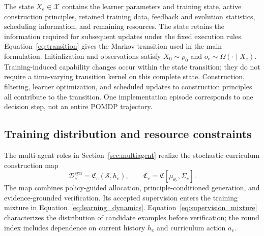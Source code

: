 The state $X_e\in\mathcal X$ contains the learner parameters and training state, active construction principles, retained training data, feedback and evolution statistics, scheduling information, and remaining resources. The state retains the information required for subsequent updates under the fixed execution rules.
Equation~\ref{eq:transition} gives the Markov transition used in the main formulation.
Initialization and observations satisfy $X_0\sim\rho_0$ and $o_e\sim\Omega(\cdot\mid X_e)$. Training-induced capability changes occur within the state transition; they do not require a time-varying transition kernel on this complete state. Construction, filtering, learner optimization, and scheduled updates to construction principles all contribute to the transition. One implementation episode corresponds to one decision step, not an entire POMDP trajectory.

\subsection{Training distribution and resource constraints}

The multi-agent roles in Section~\ref{sec:multiagent} realize the stochastic curriculum construction map
\begin{equation}
\mathcal D_e^{\mathrm{syn}}=\mathfrak C_e(\mathcal S,h_e),
\qquad
\mathfrak C_e=\mathfrak C[\mu_{\theta_e},\Sigma_e].
\label{eq:construction}
\end{equation}
The map combines policy-guided allocation, principle-conditioned generation, and evidence-grounded verification. Its accepted supervision enters the training mixture in Equation~\ref{eq:learning_dynamics}. Equation~\ref{eq:supervision_mixture} characterizes the distribution of candidate examples before verification; the round index includes dependence on current history $h_e$ and curriculum action $a_e$.

